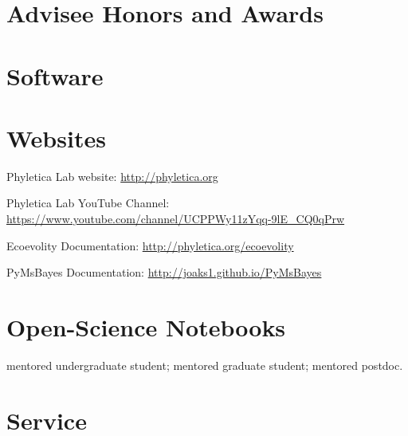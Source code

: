 \section*{Advisee Honors and Awards}


\section*{Software}


\section*{Websites}
\begin{tightItemize}
    \item Phyletica Lab website: \url{http://phyletica.org}
    \item Phyletica Lab YouTube Channel: \url{https://www.youtube.com/channel/UCPPWy11zYqq-9lE_CQ0qPrw}
    \item Ecoevolity Documentation: \url{http://phyletica.org/ecoevolity}
    \item PyMsBayes Documentation: \url{http://joaks1.github.io/PyMsBayes}
\end{tightItemize}

\section*{Open-Science Notebooks}
\ugsymbol{}mentored undergraduate student;
\phdsymbol{}mentored graduate student;
\postdocsymbol{}mentored postdoc.
\nocite{*}
\printbibliography[filter=openscinotebooks, heading=none]



\section*{Service}

